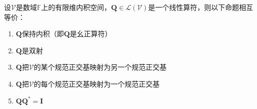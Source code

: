 \documentclass[main.tex]{subfiles}
\begin{document}
\begin{theorem}\label{thm:II.2.33}
    设$\mathcal{V}$是数域$\mathbb{F}$上的有限维内积空间，$\mathbf{Q}\in\mathcal{L}\left(\mathcal{V}\right)$是一个线性算符，则以下命题相互等价：
    \begin{enumerate}
        \item $\mathbf{Q}$保持内积（即$\mathbf{Q}$是幺正算符）
        \item $\mathbf{Q}$是双射
        \item $\mathbf{Q}$把$\mathcal{V}$的某个规范正交基映射为另一个规范正交基
        \item $\mathbf{Q}$把$\mathcal{V}$的每个规范正交基映射为一个规范正交基
        \item $\mathbf{QQ}^*=\mathbf{I}$
    \end{enumerate}
\end{theorem}
\end{document}
